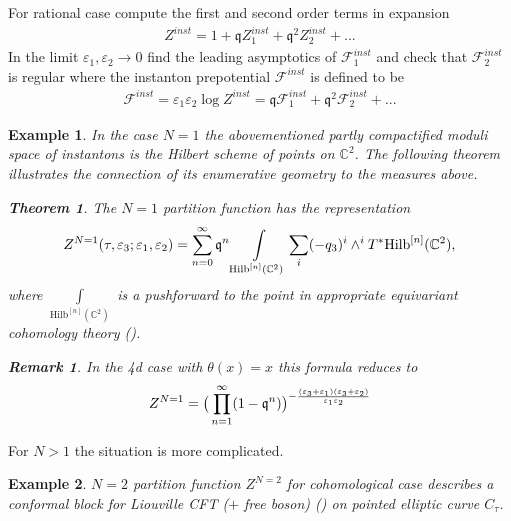 \documentclass[12pt]{article}
\newtheorem{ex}{Example}[section]
\newtheorem{rem}{Remark}[section]
\newtheorem{thm}{Theorem}[section]
\newcommand{\problemname}{}
\newenvironment{statement}[1]
 {\renewcommand{\problemname}{#1}\problem}
 {\endproblem}
\numberwithin{equation}{section}
\newcommand{\ve}{{\varepsilon}}
\theoremstyle{definition}
\newcommand {\BC}   {\mathbb C}
\begin{document}
\begin{statement}{Problem 4}\normalfont \label{prob4}
For rational case compute the first and second order terms in expansion
\begin{align*}
Z^{inst} = 1 + \mathfrak{q}Z^{inst}_{1} + \mathfrak{q}^2 Z^{inst}_{2} + ...
\end{align*}
\end{statement}
\begin{statement}{Problem 5}\normalfont \label{prob5}
In the limit $\varepsilon_1 , \varepsilon_2 \rightarrow 0$ find the leading asymptotics of $\mathcal{F}^{inst}_{1}$ and check that $\mathcal{F}^{inst}_{2}$ is regular where the instanton prepotential $\mathcal{F}^{inst}$ is defined to be
\begin{align*}
\mathcal{F}^{inst} = \varepsilon_1 \varepsilon_2 \log Z^{inst} = \mathfrak{q} \mathcal{F}^{inst}_{1} + \mathfrak{q}^2 \mathcal{F}^{inst}_{2} + ...
\end{align*}
\end{statement}
\begin{ex}\normalfont
In the case $N=1$ the abovementioned partly compactified moduli space of instantons is the Hilbert scheme of points on ${\BC}^{2}$. The following theorem illustrates the connection of its enumerative geometry to the measures above.
\begin{thm}
    The $N = 1$ partition function has the representation
\begin{align*}
     Z^{N=1} (\tau, {\ve}_{3};\varepsilon_1 , \varepsilon_2 ) = \sum\limits_{n = 0}^{\infty} \frak{q}^{n} \int\limits_{\mathrm{Hilb}^{[n]}(\mathbb{C}^{2})}\sum\limits_{i} (-q_3)^{i} \wedge^{i} T^{*} \mathrm{Hilb}^{[n]}(\mathbb{C}^{2}),
\end{align*}
where $\int\limits_{\mathrm{Hilb}^{[n]}(\mathbb{C}^{2})}$ is a pushforward to the point in appropriate equivariant cohomology theory (\cite{OkoPan2004}).
\end{thm}
\begin{rem}
    In the 4d case with $\theta(x) = x$ this formula reduces \cite{Nekrasov2015BPSCFTCN} to
\begin{align*}
    Z^{N=1} = \big(\prod\limits_{n = 1}^{\infty} (1 - \frak{q}^n ) \big)^{-\frac{({\varepsilon}_3 + {\varepsilon}_1 )({\varepsilon}_3 + {\varepsilon}_2 )}{{\varepsilon}_1 {\varepsilon}_2}}
\end{align*}
\end{rem}
\end{ex}
For $N > 1$ the situation is more complicated. 
\begin{ex}\normalfont
    $N = 2$ partition function $Z^{N=2}$ for cohomological case describes a conformal block for Liouville CFT ($+$ free boson) (\cite{Alday:2009aq}) on pointed elliptic curve $C_{\tau}$.
\end{ex}
\end{document}
